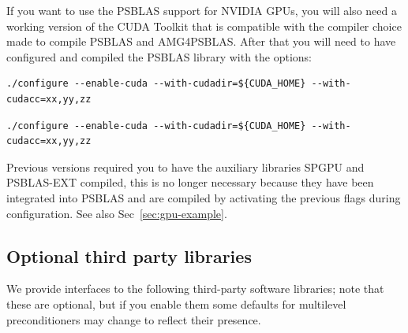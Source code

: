 If you want to use the PSBLAS support for NVIDIA GPUs, you will also
need a working version of the CUDA Toolkit that is compatible with the 
compiler choice made to compile PSBLAS and AMG4PSBLAS. 
After that you will need to have configured and compiled the PSBLAS library 
with the options:
%
\ifpdf
\begin{verbatim}
./configure --enable-cuda --with-cudadir=${CUDA_HOME} --with-cudacc=xx,yy,zz
\end{verbatim}
\else
{\small
\begin{verbatim}
./configure --enable-cuda --with-cudadir=${CUDA_HOME} --with-cudacc=xx,yy,zz		
\end{verbatim}
}	
\fi
Previous versions required you to have the auxiliary libraries SPGPU and PSBLAS-EXT compiled, 
this is no longer necessary because they have been integrated into PSBLAS and are compiled 
by activating the previous flags during configuration. See also Sec~\ref{sec:gpu-example}. 
 
\subsection{Optional third party libraries\label{sec:third-party}}

We provide interfaces to the following third-party software libraries;
note that these are optional, but if you enable them some defaults
for multilevel preconditioners may change to reflect their presence.


